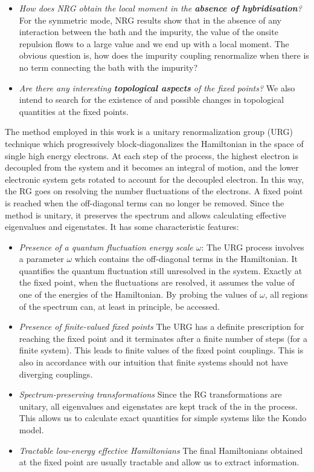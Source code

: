\documentclass[14pt]{extarticle}
\numberwithin{equation}{section}
\begin{document}
\begin{itemize}
	\item \textit{How does NRG obtain the local moment in the \textbf{absence of hybridisation}?}
	For the symmetric mode, NRG results show that in the absence of any interaction between the bath and the impurity, the value of the onsite repulsion flows to a large value and we end up with a local moment. The obvious question is, how does the impurity coupling renormalize when there is no term connecting the bath with the impurity?
	\item \textit{Are there any interesting \textbf{topological aspects} of the fixed points?}
	We also intend to search for the existence of and possible changes in topological quantities at the fixed points.
\end{itemize}
The method employed in this work is a unitary renormalization group (URG) technique which progressively block-diagonalizes the Hamiltonian in the space of single high energy electrons. At each step of the process, the highest electron is decoupled from the system and it becomes an integral of motion, and the lower electronic system gets rotated to account for the decoupled electron. In this way, the RG goes on resolving the number fluctuations of the electrons. A fixed point is reached when the off-diagonal terms can no longer be removed. Since the method is unitary, it preserves the spectrum and allows calculating effective eigenvalues and eigenstates. It has some characteristic features:
\begin{itemize}
	\item \textit{Presence of a quantum fluctuation energy scale \(\omega\)}: The URG process involves a parameter \(\omega\) which contains the off-diagonal terms in the Hamiltonian. It quantifies the quantum fluctuation still unresolved in the system. Exactly at the fixed point, when the fluctuations are resolved, it assumes the value of one of the energies of the Hamiltonian. By probing the values of \(\omega\), all regions of the spectrum can, at least in principle, be accessed.
\vspace{10pt}
	\item \textit{Presence of finite-valued fixed points}
\vspace{10pt}
The URG has a definite prescription for reaching the fixed point and it terminates after a finite number of steps (for a finite system). This leads to finite values of the fixed point  couplings. This is also in accordance with our intuition that finite systems should not have diverging couplings.
	\item \textit{Spectrum-preserving transformations}
\vspace{10pt}
Since the RG transformations are unitary, all eigenvalues and eigenstates are kept track of the in the process. This allows us to calculate exact quantities for simple systems like the Kondo model.
	\item \textit{Tractable low-energy effective Hamiltonians}
The final Hamiltonians obtained at the fixed point are usually tractable and allow us to extract information.
\end{itemize}
\end{document}
